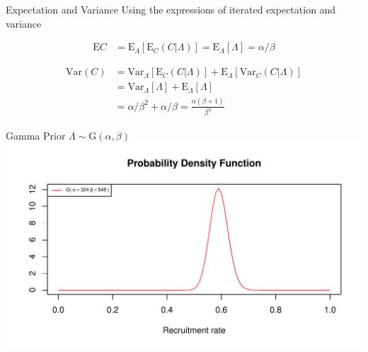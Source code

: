 \documentclass[english]{beamer}\usepackage[]{graphicx}\usepackage[]{xcolor}
\makeatletter
\def\maxwidth{ %
  \ifdim\Gin@nat@width>\linewidth
    \linewidth
  \else
    \Gin@nat@width
  \fi
}
\newenvironment{knitrout}{}{} %
\makeatother
\begin{document}
\begin{frame}{Expectation and Variance}
Using the expressions of iterated expectation and variance \citep{held2014applied}

\begin{align*}
\textrm{E}C &= \textrm{E}_{\Lambda}[\textrm{E}_{C} (C|\Lambda)] = \textrm{E}_{\Lambda}[\Lambda] = \alpha/\beta
\end{align*}

\begin{align*}
\textrm{Var}(C) &= \textrm{Var}_{\Lambda}[\textrm{E}_{C} (C|\Lambda)] + \textrm{E}_{\Lambda}[\textrm{Var}_C(C|\Lambda)]\\
&=\textrm{Var}_{\Lambda}[\Lambda] + \textrm{E}_{\Lambda}[\Lambda] \\
&=\alpha/\beta^2 + \alpha/\beta = \frac{\alpha(\beta+1)}{\beta^2}
\end{align*}
\end{frame}

\begin{frame}{Gamma Prior}
$\Lambda \sim \textrm{G}(\alpha,\beta)$
\begin{knitrout}
\color{fgcolor}
\includegraphics[width=\maxwidth]{figures/figunnamed-chunk-8-1} 
\end{knitrout}

\end{frame}
\end{document}
